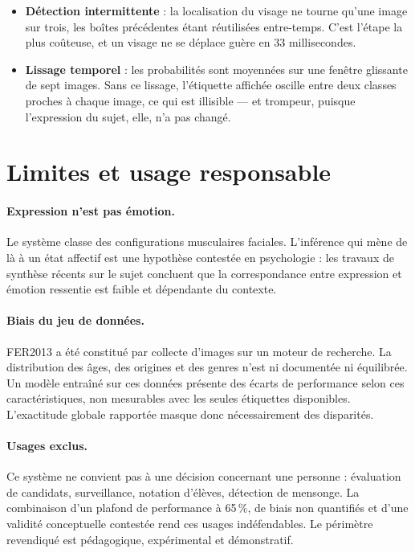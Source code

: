 \documentclass[11pt,a4paper]{article}
\begin{document}
\begin{itemize}[leftmargin=*,itemsep=1pt]
\item \textbf{Détection intermittente} : la localisation du visage ne tourne
      qu'une image sur trois, les boîtes précédentes étant réutilisées
      entre-temps. C'est l'étape la plus coûteuse, et un visage ne se déplace
      guère en 33 millisecondes.
\item \textbf{Lissage temporel} : les probabilités sont moyennées sur une fenêtre
      glissante de sept images. Sans ce lissage, l'étiquette affichée oscille
      entre deux classes proches à chaque image, ce qui est illisible --- et
      trompeur, puisque l'expression du sujet, elle, n'a pas changé.
\end{itemize}

\section{Limites et usage responsable}
\label{sec:limites}

\paragraph{Expression n'est pas émotion.}
Le système classe des configurations musculaires faciales. L'inférence qui mène
de là à un état affectif est une hypothèse contestée en psychologie : les
travaux de synthèse récents sur le sujet concluent que la correspondance entre
expression et émotion ressentie est faible et dépendante du contexte.

\paragraph{Biais du jeu de données.}
FER2013 a été constitué par collecte d'images sur un moteur de recherche. La
distribution des âges, des origines et des genres n'est ni documentée ni
équilibrée. Un modèle entraîné sur ces données présente des écarts de
performance selon ces caractéristiques, non mesurables avec les seules
étiquettes disponibles. L'exactitude globale rapportée masque donc
nécessairement des disparités.

\paragraph{Usages exclus.}
Ce système ne convient pas à une décision concernant une personne : évaluation
de candidats, surveillance, notation d'élèves, détection de mensonge. La
combinaison d'un plafond de performance à 65\,\%, de biais non quantifiés et
d'une validité conceptuelle contestée rend ces usages indéfendables. Le
périmètre revendiqué est pédagogique, expérimental et démonstratif.
\end{document}
